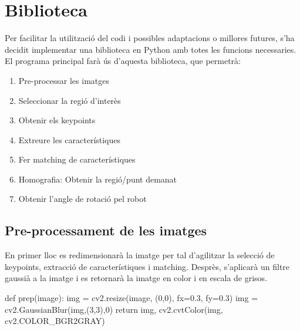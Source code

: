 \section{Biblioteca}
	Per facilitar la utilització del codi i possibles adaptacions o millores futures, s'ha decidit implementar una biblioteca en Python amb totes les funcions necessaries. El programa principal farà ús
	d'aquesta biblioteca, que permetrà:
	
	\begin{enumerate}
		\item{Pre-processar les imatges}
		\item{Seleccionar la regió d'interès}
		\item{Obtenir els keypoints}
		\item{Extreure les característiques}
		\item{Fer matching de característiques}
		\item{Homografia: Obtenir la regió/punt demanat}
		\item{Obtenir l'angle de rotació pel robot}
	\end{enumerate}

	\subsection{Pre-processament de les imatges}
		En primer lloc es redimensionarà la imatge per tal d'agilitzar la selecció de keypoints, extracció de característiques i matching. Desprès, s'aplicarà un filtre gaussià
		a la imatge i es retornarà la imatge en color i en escala de grisos.\\
		\begin{python}
def prep(image):
	img = cv2.resize(image, (0,0), fx=0.3, fy=0.3)
	img = cv2.GaussianBlur(img,(3,3),0)
	return img, cv2.cvtColor(img, cv2.COLOR_BGR2GRAY)
		\end{python}
